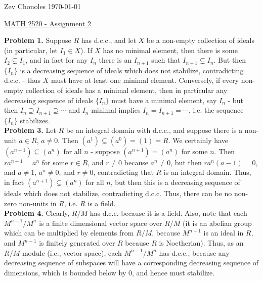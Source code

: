 \documentclass[11pt]{article}
\newcommand{\num}[1]{\noindent \textbf{#1}}
\theoremstyle{definition}
\begin{document}
\noindent Zev Chonoles \hfill \today\\[-0.4in]
\begin{center}
\noindent \underline{MATH 2520 - Assignment 2}
\end{center}

\num{Problem 1.} Suppose $R$ has d.c.c., and let $X$ be a non-empty collection
of ideals (in particular, let $I_1\in X$). If $X$ has no minimal element,
then there is some $I_2\subsetneq I_1$, and in fact for any $I_n$ there
is an $I_{n+1}$ such that $I_{n+1}\subsetneq I_n$. But then $\{I_n\}$
is a decreasing sequence of ideals which does not stabilize, contradicting
d.c.c. - thus $X$ must have at least one minimal element. Conversely, if every
non-empty collection of ideals has a minimal element, then in particular
any decreasing sequence of ideals $\{I_n\}$ must have a minimal element,
say $I_n$ - but then $I_n\supseteq I_{n+1}\supseteq \cdots$ and $I_n$ minimal
implies $I_n=I_{n+1}=\cdots$, i.e. the sequence $\{I_n\}$ stabilizes.    \\
\num{Problem 3.} Let $R$ be an integral domain with d.c.c., and
suppose there is a non-unit $a\in R$, $a\neq0$. Then $(a^1)\subsetneq
(a^0)=(1)=R$. We certainly have $(a^{n+1})\subseteq(a^n)$ for all $n$ -
suppose $(a^{n+1})=(a^n)$ for some $n$. Then $ra^{n+1}=a^n$ for some $r\in
R$, and $r\neq0$ because $a^n\neq0$, but then $ra^n(a-1)=0$, and $a\neq1$,
$a^n\neq0$, and $r\neq0$, contradicting that $R$ is an integral domain. Thus,
in fact $(a^{n+1})\subsetneq(a^n)$ for all $n$, but then this is a decreasing
sequence of ideals which does not stabilize, contradicting d.c.c. Thus,
there can be no non-zero non-units in $R$, i.e. $R$ is a field.    \\

\num{Problem 4.} Clearly, $R/M$ has d.c.c. because it is a field. Also, note
that each $M^{n-1}/M^n$ is a finite dimensional vector space over $R/M$ (it
is an abelian group which can be multiplied by elements from $R/M$, because
$M^{n-1}$ is an ideal in $R$, and $M^{n-1}$ is finitely generated over $R$
because $R$ is Noetherian). Thus, as an $R/M$-module (i.e., vector space),
each $M^{n-1}/M^n$ has d.c.c., because any decreasing sequence of subspaces
will have a corresponding decreasing sequence of dimensions, which is bounded
below by 0, and hence must stabilize. \\
\end{document}
